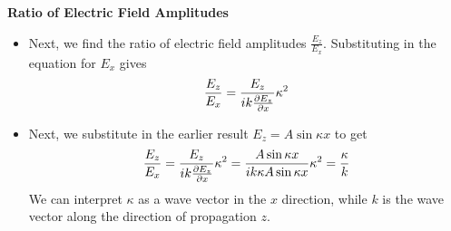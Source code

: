 \documentclass[11pt, a4paper]{article}
\renewcommand{\vec}[1]{\bm{#1}} %
\newcommand{\E}{\vec{E}}  %
\begin{document}
\textbf{Ratio of Electric Field Amplitudes}
\begin{itemize}
	\item Next, we find the ratio of electric field amplitudes $ \frac{E_{z}}{E_{x}} $. Substituting in the equation for $ E_{x} $ gives
	\begin{equation*}
		\frac{E_{z}}{E_{x}} = \frac{E_{z}}{ik\pdv{E_{z}}{x}} \kappa^{2}
	\end{equation*}
	
	
	\item Next, we substitute in the earlier result $ E_{z} = A \sin \kappa x $ to get
	\begin{equation*}
		\frac{E_{z}}{E_{x}} = \frac{E_{z}}{ik\pdv{E_{z}}{x}} \kappa^{2} = \frac{A \sin \kappa x}{ik\kappa A \sin \kappa x} \kappa^{2} = \frac{\kappa}{k}
	\end{equation*}
	We can interpret $ \kappa $ as a wave vector in the $ x $ direction, while $ k $ is the wave vector along the direction of propagation $ z $. 
	
\end{itemize}
\end{document}
